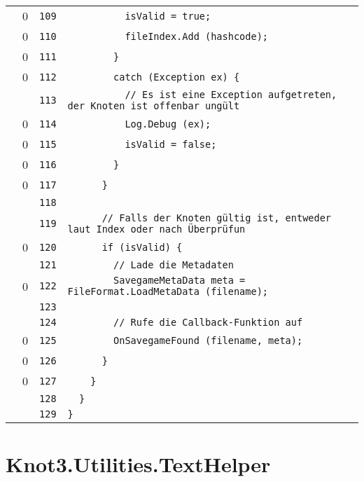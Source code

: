\documentclass[a4paper,10pt]{article}
\begin{document}
\begin{longtable}[l]{lrrl}
\cellcolor{red} & 0 & \verb~109~ & \verb~          isValid = true;~\\
\cellcolor{red} & 0 & \verb~110~ & \verb~          fileIndex.Add (hashcode);~\\
\cellcolor{red} & 0 & \verb~111~ & \verb~        }~\\
\cellcolor{red} & 0 & \verb~112~ & \verb~        catch (Exception ex) {~\\
\cellcolor{gray} &  & \verb~113~ & \verb~          // Es ist eine Exception aufgetreten, der Knoten ist offenbar ungült~\\
\cellcolor{red} & 0 & \verb~114~ & \verb~          Log.Debug (ex);~\\
\cellcolor{red} & 0 & \verb~115~ & \verb~          isValid = false;~\\
\cellcolor{red} & 0 & \verb~116~ & \verb~        }~\\
\cellcolor{red} & 0 & \verb~117~ & \verb~      }~\\
\cellcolor{gray} &  & \verb~118~ & \verb~~\\
\cellcolor{gray} &  & \verb~119~ & \verb~      // Falls der Knoten gültig ist, entweder laut Index oder nach Überprüfun~\\
\cellcolor{red} & 0 & \verb~120~ & \verb~      if (isValid) {~\\
\cellcolor{gray} &  & \verb~121~ & \verb~        // Lade die Metadaten~\\
\cellcolor{red} & 0 & \verb~122~ & \verb~        SavegameMetaData meta = FileFormat.LoadMetaData (filename);~\\
\cellcolor{gray} &  & \verb~123~ & \verb~~\\
\cellcolor{gray} &  & \verb~124~ & \verb~        // Rufe die Callback-Funktion auf~\\
\cellcolor{red} & 0 & \verb~125~ & \verb~        OnSavegameFound (filename, meta);~\\
\cellcolor{red} & 0 & \verb~126~ & \verb~      }~\\
\cellcolor{red} & 0 & \verb~127~ & \verb~    }~\\
\cellcolor{gray} &  & \verb~128~ & \verb~  }~\\
\cellcolor{gray} &  & \verb~129~ & \verb~}~\\
\end{longtable}
\newpage
\section{Knot3.Utilities.TextHelper}
\end{document}
